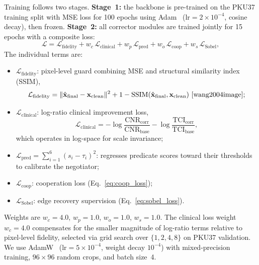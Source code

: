 \documentclass[journal,twoside,web]{ieeecolor}
\begin{document}
Training follows two stages. \textbf{Stage~1:} the backbone is pre-trained on the PKU37 training split with MSE loss for 100 epochs using Adam~\cite{kingma2015adam} ($\text{lr} = 2\!\times\!10^{-4}$, cosine decay), then frozen. \textbf{Stage~2:} all corrector modules are trained jointly for 15 epochs with a composite loss:
\begin{equation}
\mathcal{L} = \mathcal{L}_\text{fidelity} + w_c\,\mathcal{L}_\text{clinical} + w_p\,\mathcal{L}_\text{pred} + w_o\,\mathcal{L}_\text{coop} + w_s\,\mathcal{L}_\text{Sobel},
\label{eq:total_loss}
\end{equation}
The individual terms are:
\begin{itemize}
\item $\mathcal{L}_\text{fidelity}$: pixel-level guard combining MSE and structural similarity index (SSIM),
\begin{equation}
\mathcal{L}_\text{fidelity} = \|\hat{\mathbf{x}}_\text{final} - \mathbf{x}_\text{clean}\|^2 + 1 - \text{SSIM}(\hat{\mathbf{x}}_\text{final}, \mathbf{x}_\text{clean})~\text{\cite{wang2004image}};
\label{eq:fidelity_loss}
\end{equation}
\item $\mathcal{L}_\text{clinical}$: log-ratio clinical improvement loss,
\begin{equation}
\mathcal{L}_\text{clinical} = -\log\!\frac{\text{CNR}_\text{corr}}{\text{CNR}_\text{base}} - \log\!\frac{\text{TCI}_\text{corr}}{\text{TCI}_\text{base}},
\label{eq:clinical_loss}
\end{equation}
which operates in log-space for scale invariance;
\item $\mathcal{L}_\text{pred} = \sum_{i=1}^{6}(s_i - \tau_i)^2$: regresses predicate scores toward their thresholds to calibrate the negotiator;
\item $\mathcal{L}_\text{coop}$: cooperation loss (Eq.~\eqref{eq:coop_loss});
\item $\mathcal{L}_\text{Sobel}$: edge recovery supervision (Eq.~\eqref{eq:sobel_loss}).
\end{itemize}
Weights are $w_c = 4.0$, $w_p = 1.0$, $w_o = 1.0$, $w_s = 1.0$. The clinical loss weight $w_c = 4.0$ compensates for the smaller magnitude of log-ratio terms relative to pixel-level fidelity, selected via grid search over $\{1, 2, 4, 8\}$ on PKU37 validation. We use AdamW~\cite{loshchilov2019decoupled} ($\text{lr} = 5\!\times\!10^{-4}$, weight decay $10^{-4}$) with mixed-precision training, $96\times 96$ random crops, and batch size~4.
\end{document}
